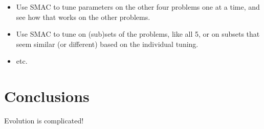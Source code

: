 \begin{itemize}
	\item Use SMAC to tune parameters on the other four problems one at a time, and see how that works on the other problems.
	\item Use SMAC to tune on (sub)sets of the problems, like all 5, or on subsets that seem similar (or different) based on the individual tuning.
	\item etc.
\end{itemize}

\section{Conclusions}
\label{sec:conclusion}

Evolution is complicated!

